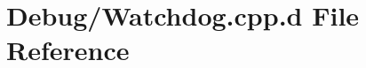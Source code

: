 \hypertarget{_debug_2_watchdog_8cpp_8d}{\section{\-Debug/\-Watchdog.cpp.\-d \-File \-Reference}
\label{_debug_2_watchdog_8cpp_8d}
}
